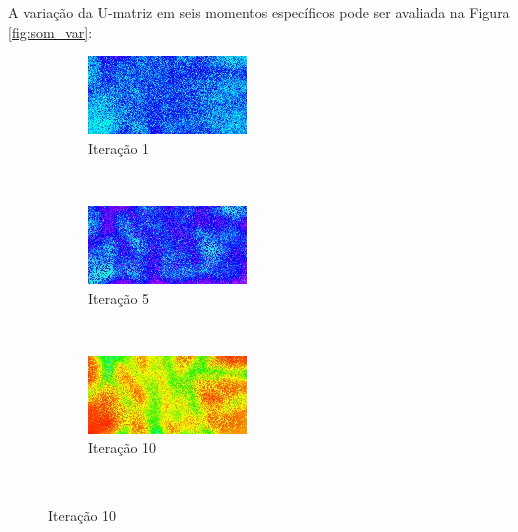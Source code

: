 A variação da U-matriz em seis momentos específicos pode ser avaliada na
Figura \ref{fig:som_var}:

\begin{figure}[H]
  \centering

  \begin{subfigure}{0.3\textwidth}
    \includegraphics[width=\textwidth]{imagens/som6_aux.jpg}
    \caption{Iteração 1}
    \label{fig:som1}
  \end{subfigure}~
  \begin{subfigure}{0.3\textwidth}
    \includegraphics[width=\textwidth]{imagens/som5_aux.jpg}
    \caption{Iteração 5}
    \label{fig:som2}
  \end{subfigure}~
  \begin{subfigure}{0.3\textwidth}
    \includegraphics[width=\textwidth]{imagens/som4_aux.jpg}
    \caption{Iteração 10}
    \label{fig:som3}
  \end{subfigure}~


\end{figure}
